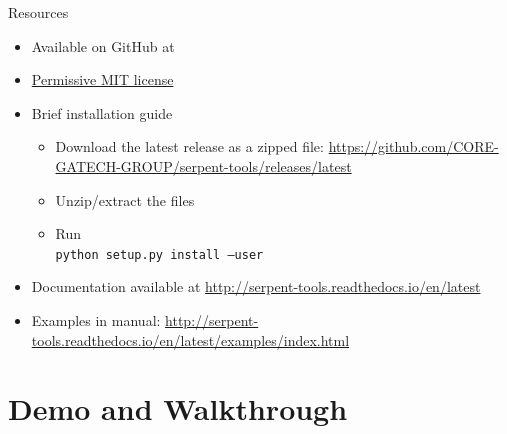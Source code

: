 \begin{frame}{Resources}
    \begin{itemize}
        \item Available on GitHub at \github{}
        \item \href{https://github.com/CORE-GATECH-GROUP/serpent-tools/blob/master/LICENSE}{Permissive MIT license}
        \item Brief installation guide
            \begin{itemize}
                \item Download the latest release as a zipped file: \url{https://github.com/CORE-GATECH-GROUP/serpent-tools/releases/latest}
                \item Unzip/extract the files
                \item Run \\ \texttt{python setup.py install --user}
            \end{itemize}
        \item Documentation available at \url{http://serpent-tools.readthedocs.io/en/latest}
        \item<handout> Examples in manual: \url{http://serpent-tools.readthedocs.io/en/latest/examples/index.html}
    \end{itemize}
\end{frame}

\section{Demo and Walkthrough}

